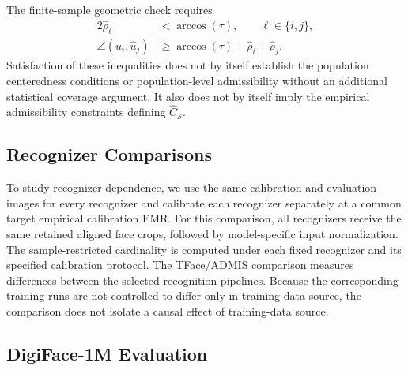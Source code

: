 \documentclass[journal]{IEEEtran}
\begin{document}
\begin{bibunit}
The finite-sample geometric check requires
%
\begin{align}
2\widehat\rho_\ell &<\arccos(\tau),
\qquad \ell\in\{i,j\},
\\
\angle(\widehat u_i,\widehat u_j) &\ge \arccos(\tau)+\widehat\rho_i+\widehat\rho_j.
\end{align}
%
Satisfaction of these inequalities does not by itself establish the population centeredness conditions or population-level admissibility without an additional statistical coverage argument. It also does not by itself imply the empirical admissibility constraints defining $\widehat C_{\mathcal S}$.






\subsection{Recognizer Comparisons}

To study recognizer dependence, we use the same calibration and evaluation images for every recognizer and calibrate each recognizer separately at a common target empirical calibration FMR. For this comparison, all recognizers receive the same retained aligned face crops, followed by model-specific input normalization. The sample-restricted cardinality is computed under each fixed recognizer and its specified calibration protocol. The TFace/ADMIS comparison measures differences between the selected recognition pipelines. Because the corresponding training runs are not controlled to differ only in training-data source, the comparison does not isolate a causal effect of training-data source.


\subsection{DigiFace-1M Evaluation}


\end{bibunit}
\end{document}
